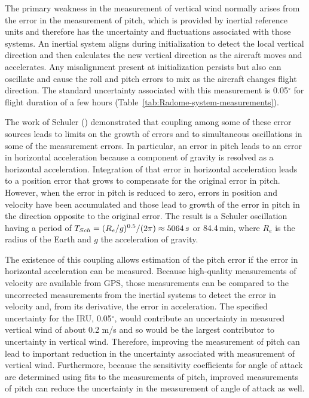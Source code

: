 \documentclass[12pt,twoside,english]{article}\usepackage[]{graphicx}\usepackage[]{color}
\let\OrgIndex\index
\renewcommand*{\index}[1]{\OrgIndex{#1}}
\begin{document}
The primary weakness in the measurement of vertical wind normally arises from the error in the measurement of pitch, which is provided by inertial reference units and therefore has the uncertainty and fluctuations associated with those systems. An inertial system aligns during initialization to detect the local vertical direction and then calculates the new vertical direction as the aircraft moves and accelerates. Any misalignment present at initialization persists but also can oscillate and cause the roll and pitch errors to mix as the aircraft changes flight direction. The standard uncertainty associated with this measurement is 0.05$^{\circ}$ for flight duration of a few hours (Table~\ref{tab:Radome-system-measurements}).

The work of Schuler (\citet{Schuler1923}) demonstrated that coupling among some of these error sources leads to limits on the growth of errors and to simultaneous oscillations in some of the measurement errors. In particular, an error in pitch leads to an error in horizontal acceleration because a component of gravity is resolved as a horizontal acceleration. Integration of that error in horizontal acceleration leads to a position error that grows to compensate for the original error in pitch. However, when the error in pitch is reduced to zero, errors in position and velocity have been accumulated and those lead to growth of the error in pitch in the direction opposite to the original error. The result is a Schuler oscillation having a period of $T_{Sch}=(R_{e}/g)^{0.5}/(2\pi)\approx5064\thinspace s$ or 84.4\,min, where $R_{e}$ is the radius of the Earth and $g$ the acceleration of gravity. 

The existence of this coupling allows estimation of the pitch error if the error in horizontal acceleration can be measured. Because high-quality measurements of velocity are available from GPS, those measurements can be compared to the uncorrected measurements from the inertial systems to detect the error in velocity and, from its derivative, the error in acceleration. The specified uncertainty for the IRU, 0.05$^{\circ}$, would contribute an uncertainty in measured vertical wind of about 0.2 m/s and so would be the largest contributor to uncertainty in vertical wind. Therefore, improving the measurement of pitch can lead to important reduction in the uncertainty associated with measurement of vertical wind. 
Furthermore, because the sensitivity coefficients for angle of attack are determined using fits to the measurements of pitch, improved measurements of pitch can reduce the uncertainty in the measurement of angle of attack as well.
\end{document}
